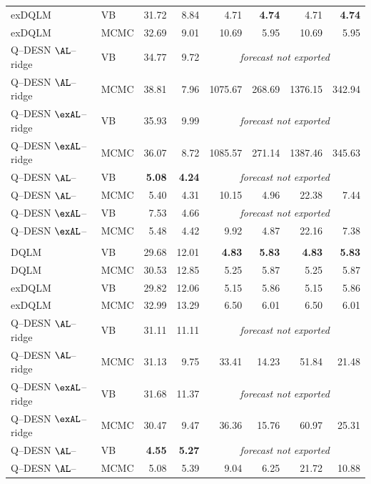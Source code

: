 \begin{table}[H]
\begin{tabular}{@{}llrrrrrr@{}}
exDQLM & VB & 31.72 & 8.84 & 4.71 & \textbf{4.74} & 4.71 & \textbf{4.74} \\
exDQLM & MCMC & 32.69 & 9.01 & 10.69 & 5.95 & 10.69 & 5.95 \\
Q--DESN \(\AL\)--ridge & VB & 34.77 & 9.72 & \multicolumn{4}{c}{\emph{forecast not exported}} \\
Q--DESN \(\AL\)--ridge & MCMC & 38.81 & 7.96 & 1075.67 & 268.69 & 1376.15 & 342.94 \\
Q--DESN \(\exAL\)--ridge & VB & 35.93 & 9.99 & \multicolumn{4}{c}{\emph{forecast not exported}} \\
Q--DESN \(\exAL\)--ridge & MCMC & 36.07 & 8.72 & 1085.57 & 271.14 & 1387.46 & 345.63 \\
Q--DESN \(\AL\)--\RHS{} & VB & \textbf{5.08} & \textbf{4.24} & \multicolumn{4}{c}{\emph{forecast not exported}} \\
Q--DESN \(\AL\)--\RHS{} & MCMC & 5.40 & 4.31 & 10.15 & 4.96 & 22.38 & 7.44 \\
Q--DESN \(\exAL\)--\RHS{} & VB & 7.53 & 4.66 & \multicolumn{4}{c}{\emph{forecast not exported}} \\
Q--DESN \(\exAL\)--\RHS{} & MCMC & 5.48 & 4.42 & 9.92 & 4.87 & 22.16 & 7.38 \\
\addlinespace[0.25em]
\multicolumn{8}{@{}l}{\emph{$\tau = 0.50$}}\\
DQLM & VB & 29.68 & 12.01 & \textbf{4.83} & \textbf{5.83} & \textbf{4.83} & \textbf{5.83} \\
DQLM & MCMC & 30.53 & 12.85 & 5.25 & 5.87 & 5.25 & 5.87 \\
exDQLM & VB & 29.82 & 12.06 & 5.15 & 5.86 & 5.15 & 5.86 \\
exDQLM & MCMC & 32.99 & 13.29 & 6.50 & 6.01 & 6.50 & 6.01 \\
Q--DESN \(\AL\)--ridge & VB & 31.11 & 11.11 & \multicolumn{4}{c}{\emph{forecast not exported}} \\
Q--DESN \(\AL\)--ridge & MCMC & 31.13 & 9.75 & 33.41 & 14.23 & 51.84 & 21.48 \\
Q--DESN \(\exAL\)--ridge & VB & 31.68 & 11.37 & \multicolumn{4}{c}{\emph{forecast not exported}} \\
Q--DESN \(\exAL\)--ridge & MCMC & 30.47 & 9.47 & 36.36 & 15.76 & 60.97 & 25.31 \\
Q--DESN \(\AL\)--\RHS{} & VB & \textbf{4.55} & \textbf{5.27} & \multicolumn{4}{c}{\emph{forecast not exported}} \\
Q--DESN \(\AL\)--\RHS{} & MCMC & 5.08 & 5.39 & 9.04 & 6.25 & 21.72 & 10.88 \\

\end{tabular}
\end{table}
